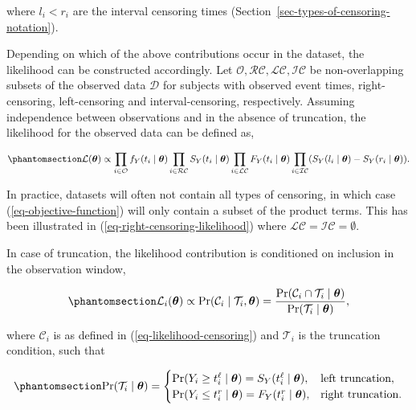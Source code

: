 \documentclass[
  letterpaper,
  krantz2]{style/krantz}
\begin{document}
where \(l_i < r_i\) are the interval censoring times
(Section~\ref{sec-types-of-censoring-notation}).

Depending on which of the above contributions occur in the dataset, the
likelihood can be constructed accordingly. Let
\(\mathcal{O}, \mathcal{RC}, \mathcal{LC}, \mathcal{IC}\) be
non-overlapping subsets of the observed data \(\mathcal{D}\) for
subjects with observed event times, right-censoring, left-censoring and
interval-censoring,
respectively.
Assuming independence between observations and in the absence of
truncation, the likelihood for the observed data can be defined as,

\begin{equation}\phantomsection\label{eq-objective-function}{
\mathcal{L}(\boldsymbol{\theta}) \propto \prod_{i \in \mathcal{O}}f_Y(t_i \mid \boldsymbol{\theta}) \prod_{i \in \mathcal{RC}}S_Y(t_i \mid \boldsymbol{\theta}) \prod_{i \in \mathcal{LC}}F_Y(t_i \mid \boldsymbol{\theta})\prod_{i \in \mathcal{IC}}(S_Y(l_i \mid \boldsymbol{\theta})-S_Y(r_i \mid \boldsymbol{\theta})).
}\end{equation}

In practice, datasets will often not contain all types of censoring, in
which case (\ref{eq-objective-function}) will only contain a subset of
the product terms. This has been illustrated in
(\ref{eq-right-censoring-likelihood}) where
\(\mathcal{LC}=\mathcal{IC}=\emptyset\).

In case of truncation, the likelihood contribution is
conditioned on inclusion in the observation window,

\begin{equation}\phantomsection\label{eq-likelihood-combined}{
\mathcal{L}_i(\boldsymbol{\theta}) \propto \Pr(\mathcal{C}_i \mid \mathcal{T}_i, \boldsymbol{\theta}) = \frac{\Pr(\mathcal{C}_i \cap \mathcal{T}_i \mid \boldsymbol{\theta})}{\Pr(\mathcal{T}_i \mid \boldsymbol{\theta})},
}\end{equation}

where \(\mathcal{C}_i\) is as defined in (\ref{eq-likelihood-censoring})
and \(\mathcal{T}_i\) is the truncation condition, such that

\begin{equation}\phantomsection\label{eq-likelihood-truncation}{
\Pr(\mathcal{T}_i \mid \boldsymbol{\theta}) =
\begin{cases}
\Pr(Y_i \geq t_i^\ell \mid \boldsymbol{\theta}) = S_Y(t_i^\ell \mid \boldsymbol{\theta}), & \text{left truncation}, \\
\Pr(Y_i \leq t_i^r \mid \boldsymbol{\theta}) = F_Y(t_i^r \mid \boldsymbol{\theta}), & \text{right truncation}.
\end{cases}
}\end{equation}
\end{document}
